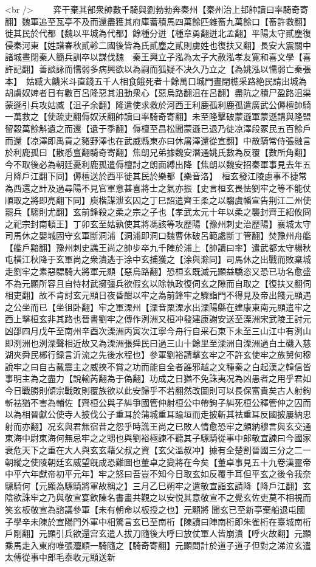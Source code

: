 <br />
　　弈干棄其部衆帥數千騎與劉勃勃奔秦州【秦州治上邽帥讀曰率騎奇寄翻】魏軍追至瓦亭不及而還盡獲其府庫蓄積馬四萬餘匹雜畜九萬餘口【畜許救翻】徙其民於代都【魏以平城為代都】餘種分迸【種章勇翻迸北孟翻】平陽太守貳塵復侵秦河東【姓譜春秋貳軫二國後皆為氏貳塵之貳則虜姓也復扶又翻】長安大震關中諸城晝閉秦人簡兵訓卒以謀伐魏　秦王興立子泓為太子大赦泓孝友寛和喜文學【喜許記翻】善談詠而懦弱多病興欲以為嗣而狐疑不决久乃立之【為姚泓以懦弱亡秦張本】　姑臧大饑米斗直錢五千人相食餓死者十餘萬口城門晝閉樵采路絶民請出城為胡虜奴婢者日有數百呂隆惡其沮動衆心【惡烏路翻沮在呂翻】盡阬之積尸盈路沮渠蒙遜引兵攻姑臧【沮子余翻】隆遣使求救於河西王利鹿孤利鹿孤遣廣武公傉檀帥騎一萬救之【使疏吏翻傉奴沃翻帥讀曰率騎奇寄翻】未至隆擊破蒙遜軍蒙遜請與隆盟留穀萬餘斛遺之而還【遺于季翻】傉檀至昌松聞蒙遜已退乃徙凉澤段冢民五百餘戶而還【凉澤即禹貢之豬野澤也在武威縣東亦曰休屠澤還從宣翻】中散騎常侍張融言於利鹿孤曰【散悉亶翻騎奇寄翻】焦朗兄弟據魏安潛通姚氏數為反覆【數所角翻】今不取後必為朝廷憂利鹿孤遣傉檀討之朗面縛出降【焦朗以魏安招秦軍事見去年五月降戶江翻下同】傉檀送於西平徙其民於樂都【樂音洛】　桓玄發江陵慮事不捷常為西還之計及過尋陽不見官軍意甚喜將士之氣亦振【史言桓玄畏怯劉牢之等不能仗順取之將即亮翻下同】庾楷謀泄玄囚之丁巳詔遣齊王柔之以騶虞幡宣告荆江二州使罷兵【騶則尤翻】玄前鋒殺之柔之宗之子也【孝武太元十年以柔之襲封齊王紹攸冏之祀宗封南頓王】丁卯玄至姑孰使其將馮該等攻歷陽【豫州刺史治歷陽】襄城太守司馬休之嬰城固守玄軍斷洞浦【洞浦即洞口魏曹休破呂範處斷丁管翻】焚豫州舟艦【艦戶黯翻】豫州刺史譙王尚之帥步卒九千陣於浦上【帥讀曰率】遣武都太守楊秋屯横江秋降于玄軍尚之衆潰逃于涂中玄捕獲之【涂與滁同】司馬休之出戰而敗棄城走劉牢之素惡驃騎大將軍元顯【惡烏路翻】恐桓玄既滅元顯益驕恣又恐已功名愈盛不為元顯所容且自恃材武擁彊兵欲假玄以除執政復伺玄之隙而自取之【復扶又翻伺相吏翻】故不肯討玄元顯日夜昏酣以牢之為前鋒牢之驟詣門不得見及帝出餞元顯遇之公坐而已【坐徂卧翻】牢之軍溧州【溧音栗溧水出溧陽縣在建康東南元顯遣牢之西上擊桓玄非其路也晉書劉牢之傳作洌洲又桓冲發建康謝安送至溧洲宋武陵王討元凶邵四月戊午至南州辛酉次溧洲丙寅次江寧今舟行自采石東下未至三山江中有洌山即洌洲也洌溧聲相近故又為溧洲張舜民曰過三山十餘里至溧洲自溧洲過白土磯入慈湖夾舜民郴行録言沂流之先後水程也】參軍劉裕請擊玄牢之不許玄使牢之族舅何穆說牢之曰自古戴震主之威挾不賞之功而能自全者誰邪越之文種秦之白起漢之韓信皆事明主為之盡力【說輸芮翻為于偽翻】功成之日猶不免誅夷况為凶愚者之用乎君如今日戰勝則傾宗戰敗則覆族欲以此安歸乎不若翻然改圖則可以長保富貴矣古人射鉤斬袪猶不害為輔佐【齊桓公與子糾爭國管仲射桓公中帶鉤子糾死桓公釋管仲之囚而以為相晉獻公使寺人披伐公子重耳於蒲城重耳踰垣而走披斬其袪重耳反國披屢納忠射而亦翻】况玄與君無宿昔之怨乎時譙王尚之已敗人情愈恐牢之頗納穆言與玄交通東海中尉東海何無忌牢之之甥也與劉裕極諫不聽其子驃騎從事中郎敬宣諫曰今國家衰危天下之重在大人與玄玄藉父叔之資【玄父溫叔冲】據有全楚割晉國三分之二一朝縱之使陵朝廷玄威望旣成恐難圖也董卓之變將在今矣【董卓事見五十九卷漢靈帝中平六年獻帝初平元年】牢之怒曰吾豈不知今日取玄如反覆手耳但平玄之後令我奈驃騎何【元顯為驃騎將軍故稱之】三月乙巳朔牢之遣敬宣詣玄請降【降戶江翻】玄陰欲誅牢之乃與敬宣宴飲陳名書畫共觀之以安悦其意敬宣不之覺玄佐吏莫不相視而笑玄板敬宣為諮議參軍【未有朝命以板授之也】元顯將聞玄已至新亭棄船退屯國子學辛未陳於宣陽門外軍中相驚言玄已至南桁【陳讀曰陣南桁即朱雀桁在臺城南桁戶剛翻】元顯引兵欲還宫玄遣人拔刀隨後大呼曰放仗軍人皆崩潰【呼火故翻】元顯乘馬走入東府唯張灋順一騎隨之【騎奇寄翻】元顯問計於道子道子但對之涕泣玄遣太傅從事中郎毛泰收元顯送新